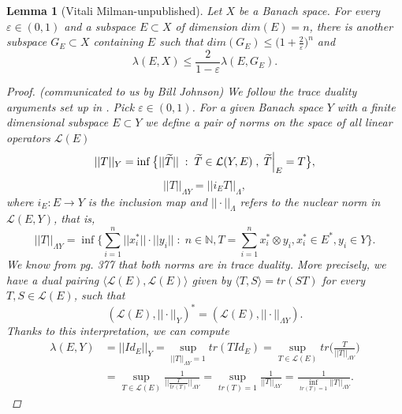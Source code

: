\documentclass[11pt]{amsart}
\newcommand{\ep}{\varepsilon}
\newcommand{\N}{\mathbb{N}}
\newcommand\restr[2]{{%
  \left.\kern-\nulldelimiterspace %
  #1 %
  \vphantom{\big|} %
  \right|_{#2} %
  }}
\newcommand{\<}{\langle}
\renewcommand{\>}{\rangle}
\newtheorem{lemma}[theorem]{Lemma}
\theoremstyle{definition}
\theoremstyle{remark}
\numberwithin{equation}{section}
\begin{document}
\begin{lemma}[Vitali Milman-unpublished]\label{lemmaJohnson}
Let $X$ be a Banach space. For every $\ep\in(0,1)$ and a subspace $E\subset X$  of dimension $dim(E)=n$, there is another subspace $G_E\subset X$ containing $E$ such that $dim(G_E)\le\big( 1+\frac{2}{\ep} \big)^n$ and
$$\lambda(E,X)\le \frac{2}{1-\ep}\lambda(E,G_E).$$
\begin{proof}(communicated to us by Bill Johnson)
We follow the trace duality arguments set up  in  \cite{JKM79}.
Pick $\ep\in(0,1)$. For a given Banach space $Y$ with a finite dimensional subspace $E\subset Y$ we define a pair of norms on the space of all linear operators $\mathcal{L}(E)$
$$||T||_Y=\inf\big\{ ||\widetilde{T}||\;:\; \widetilde{T}\in\mathcal{L}(Y,E)\;,\;\restr{\widetilde{T}}{E}=T \big\},$$
$$||T||_{\Lambda Y}=||i_ET||_{\Lambda},$$
where $i_E:E\rightarrow Y$ is the inclusion map and $||\cdot||_{\Lambda}$ refers to the nuclear norm in $\mathcal{L}(E,Y)$, that is,
$$||T||_{\Lambda Y}=\inf\bigg\{ \sum\limits_{i=1}^n||x_i^*||\cdot||y_i||\;:\;n\in\N,T=\sum\limits_{i=1}^nx_i^*\otimes y_i, x_i^*\in E^*,y_i\in Y \bigg\} .$$
We know from \cite{JKM79} pg. 377 that both norms are in trace duality. More precisely, we have a dual pairing $\langle\mathcal{L}(E), \mathcal{L}(E)\rangle$ 
given by $\langle T,S \rangle=tr(ST)$ for every $T,S\in\mathcal{L}(E)$, such that
$$(\mathcal{L}(E),||\cdot||_Y)^*=(\mathcal{L}(E),||\cdot||_{\Lambda Y}).$$
Thanks to this interpretation, we can compute
$$\begin{aligned}\lambda(E,Y)&=||Id_E||_Y=\sup\limits_{||T||_{\Lambda Y}=1}tr(TId_E)=\sup\limits_{T\in\mathcal{L}(E)}tr\bigg(\frac{T}{||T||_{\Lambda Y}}\bigg)\\&=\sup\limits_{T\in\mathcal{L}(E)}\frac{1}{\bigg|\bigg| \frac{T}{tr(T)} \bigg|\bigg|_{\Lambda Y}}=\sup\limits_{tr(T)=1}\frac{1}{||T||_{\Lambda Y}}=\frac{1}{\inf\limits_{tr(T)=1}||T||_{\Lambda Y}}.\end{aligned}$$


\end{proof}
\end{lemma}
\end{document}
